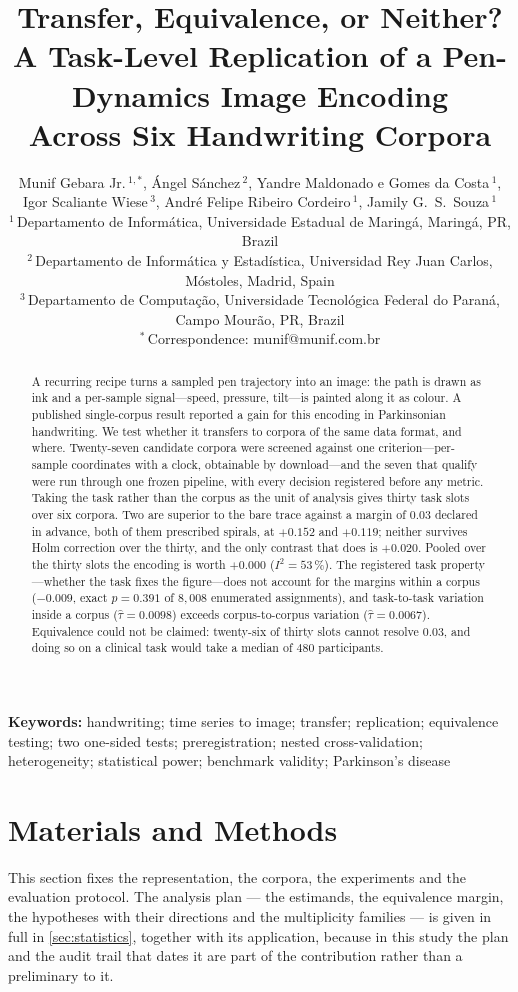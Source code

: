 \documentclass[10pt,a4paper]{article}
\title{\bfseries Transfer, Equivalence, or Neither?\\
       A Task-Level Replication of a Pen-Dynamics Image Encoding\\
       Across Six Handwriting Corpora}
\author{%
  Munif Gebara Jr.\,$^{1,*}$,\;
  \'Angel S\'anchez\,$^{2}$,\;
  Yandre Maldonado e Gomes da Costa\,$^{1}$,\\
  Igor Scaliante Wiese\,$^{3}$,\;
  Andr\'e Felipe Ribeiro Cordeiro\,$^{1}$,\;
  Jamily G.\ S.\ Souza\,$^{1}$\\[0.7em]
  \small $^{1}$\,Departamento de Inform\'atica, Universidade Estadual de Maring\'a,
    Maring\'a, PR, Brazil\\
  \small $^{2}$\,Departamento de Inform\'atica y Estad\'istica, Universidad Rey Juan Carlos,
    M\'ostoles, Madrid, Spain\\
  \small $^{3}$\,Departamento de Computa\c{c}\~ao, Universidade Tecnol\'ogica Federal do Paran\'a,
    Campo Mour\~ao, PR, Brazil\\[0.3em]
  \small $^{*}$\,Correspondence: munif@munif.com.br
}
\date{}
\begin{document}
\maketitle

\begin{abstract}
\noindent
A recurring recipe turns a sampled pen trajectory into an image: the path is drawn as ink and a
per-sample signal---speed, pressure, tilt---is painted along it as colour. A published
single-corpus result reported a gain for this encoding in Parkinsonian handwriting. We test whether
it transfers to corpora of the same data format, and where. Twenty-seven candidate corpora were
screened against one criterion---per-sample coordinates with a clock, obtainable by
download---and the seven that qualify were run through one frozen pipeline, with every decision
registered before any metric. Taking the task rather than the corpus as the unit of analysis gives
thirty task slots over six corpora. Two are superior to the bare trace against a margin of $0.03$
declared in advance, both of them prescribed spirals, at $+0.152$ and $+0.119$; neither survives
Holm correction over the thirty, and the only contrast that does is $+0.020$. Pooled over the
thirty slots the encoding is worth $+0.000$ ($I^2 = 53\,\%$). The registered task property---whether
the task fixes the figure---does not account for the margins within a corpus ($-0.009$, exact
$p = 0.391$ of $8{,}008$ enumerated assignments), and task-to-task variation inside a corpus
($\hat\tau = 0.0098$) exceeds corpus-to-corpus variation ($\hat\tau = 0.0067$). Equivalence could
not be claimed: twenty-six of thirty slots cannot resolve $0.03$, and doing so on a clinical task
would take a median of $480$ participants.
\end{abstract}

\noindent\textbf{Keywords:} handwriting; time series to image; transfer; replication; equivalence
testing; two one-sided tests; preregistration; nested cross-validation; heterogeneity; statistical
power; benchmark validity; Parkinson's disease

\vspace{1em}



\section{Materials and Methods}
\label{sec:methods}

This section fixes the representation, the corpora, the experiments and the evaluation protocol.
The analysis plan --- the estimands, the equivalence margin, the hypotheses with their directions
and the multiplicity families --- is given in full in \cref{sec:statistics}, together with its
application, because in this study the plan and the audit trail that dates it are part of the
contribution rather than a preliminary to it.



















\clearpage


\end{document}
